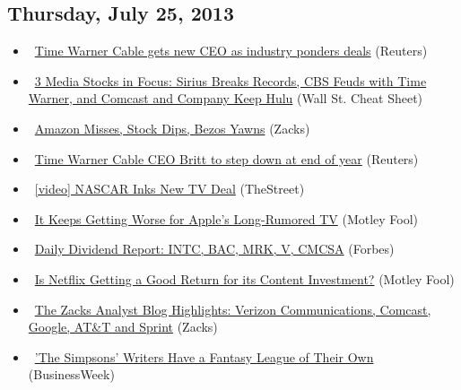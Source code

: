 \documentclass[11pt,asymmetric]{article}
\begin{document}
\subsection*{Thursday, July 25, 2013}
\begin{itemize}
\item\ \href{http://finance.yahoo.com/news/time-warner-cable-gets-ceo-234404299.html}{Time Warner Cable gets new CEO as industry ponders deals} (Reuters)
\item\ \href{http://wallstcheatsheet.com/stocks/3-media-stocks-in-focus-sirius-breaks-records-cbs-feuds-with-time-warner-and-comcast-and-company-keep-hulu.html/?ref=YF}{3 Media Stocks in Focus: Sirius Breaks Records, CBS Feuds with Time Warner, and Comcast and Company Keep Hulu} (Wall St. Cheat Sheet)
\item\ \href{http://finance.yahoo.com/news/amazon-misses-stock-dips-bezos-204135288.html}{Amazon Misses, Stock Dips, Bezos Yawns} (Zacks)
\item\ \href{http://www.reuters.com/article/2013/07/25/timewarnercable-ceo-idUSL1N0FV1VZ20130725?feedType=RSS&feedName=financialsSector&rpc=43}{Time Warner Cable CEO Britt to step down at end of year} (Reuters)
\item\ \href{http://www.thestreet.com/_yahoo/story/11989776/1/nascar-inks-new-tv-deal.html?cm_ven=YAHOOV&cm_cat=FREE&cm_ite=NA}{[video] NASCAR Inks New TV Deal} (TheStreet)
\item\ \href{http://beta.fool.com/joekurtz/2013/07/25/it-keep-getting-worse-for-apples-long-rumored-tv/41466/?source=eogyholnk0000001}{It Keeps Getting Worse for Apple’s Long-Rumored TV} (Motley Fool)
\item\ \href{http://www.forbes.com/sites/marketnewsvideo/2013/07/25/daily-dividend-report-intc-bac-mrk-v-cmcsa/?partner=yahootix}{Daily Dividend Report: INTC, BAC, MRK, V, CMCSA} (Forbes)
\item\ \href{http://beta.fool.com/markhibben/2013/07/25/is-netflix-getting-a-good-return-for-its-content-i/41357/?source=eogyholnk0000001}{Is Netflix Getting a Good Return for its Content Investment?} (Motley Fool)
\item\ \href{http://finance.yahoo.com/news/zacks-analyst-blog-highlights-verizon-121631989.html}{The Zacks Analyst Blog Highlights: Verizon Communications, Comcast, Google, AT\&T and Sprint} (Zacks)
\item\ \href{http://www.businessweek.com/articles/2013-07-25/the-simpsons-writers-have-a-fantasy-league-of-their-own?campaign_id=yhoo}{'The Simpsons' Writers Have a Fantasy League of Their Own} (BusinessWeek)
\end{itemize}
\end{document}
